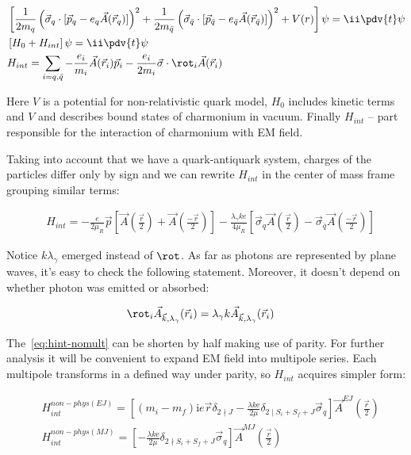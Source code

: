\begin{align}
    &\left[\frac{1}{2m_q} \left( \vec{\sigma}_q \cdot [\vec{p}_q - e_q \vec{A}(\vec{r}_q)] \right)^2 + \frac{1}{2m_{\bar{q}}} \left( \vec{\sigma}_{\bar{q}} \cdot [\vec{p}_{\bar{q}} - e_{\bar{q}} \vec{A}(\vec{r}_{\bar{q}})] \right)^2 + V(r) \right] \psi = \ii \pdv{t} \psi \\
    &\left[H_0 + H_{int} \right] \psi= \ii \pdv{t} \psi \\
    &H_{int} = \sum_{i = q, \bar{q}} -\frac{e_i}{m_i} \vec{A}(\vec{r}_i) \vec{p}_i - \frac{e_i}{2 m_i} \vec{\sigma} \cdot \rot_i \vec{A}(\vec{r}_i)
\end{align}

Here $V$ is a potential for non-relativistic quark model, $H_0$ includes kinetic terms and $V$ and describes bound states of charmonium in vacuum. Finally $H_{int}$ -- part responsible for the interaction of charmonium with EM field.

Taking into account that we have a quark-antiquark system, charges of the particles differ only by sign and we can rewrite $H_{int}$ in the center of mass frame grouping similar terms:

\begin{align} \label{eq:hint-nomult}
    &H_{int} = -\frac{e}{2 \mu_R} \vec{p} \left[ \vec{A}(\frac{\vec{r}}{2}) + \vec{A}(\frac{-\vec{r}}{2}) \right]-\frac{\lambda_\gamma k e}{4 \mu_R}\left[ \vec{\sigma}_q \vec{A}(\frac{\vec{r}}{2}) - \vec{\sigma}_{\bar{q}} \vec{A}(\frac{-\vec{r}}{2}) \right]
\end{align}

Notice $k \lambda_\gamma$ emerged instead of $\rot$. As far as photons are represented by plane waves, it's easy to check the following statement. Moreover, it doesn't depend on whether photon was emitted or absorbed:

\begin{align}
    &\rot_i \vec{A}_{\vec{k}, \lambda_\gamma}(\vec{r}_i) = \lambda_\gamma k \vec{A}_{\vec{k}, \lambda_\gamma}(\vec{r}_i)
\end{align}

The~\cref{eq:hint-nomult} can be shorten by half making use of parity. For further analysis it will be convenient to expand EM field into multipole series. Each multipole transforms in a defined way under parity, so $H_{int}$ acquires simpler form:

\begin{align} \label{hint-mult-nobrak}
    &H_{int}^{non-phys (EJ)} = \left[(m_i - m_f) \mathrm{i} e \vec{r} \delta_{2 \nmid J} - \frac{\lambda k \mathrm{e}}{2 \mu} \delta_{2 \mid S_i + S_f + J} \vec{\sigma}_{q} \right] \vec{A}^{EJ}(\frac{\vec{r}}{2}) \\
    &H_{int}^{non-phys (MJ)} = \left[ -\frac{\lambda k \mathrm{e}}{2 \mu} \delta_{2 \nmid S_i + S_f + J} \vec{\sigma}_{q} \right] \vec{A}^{MJ}(\frac{\vec{r}}{2})
\end{align}

